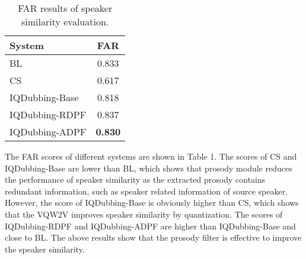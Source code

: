 \documentclass{article}
\begin{document}
\begin{table}[!htbp]
\centering
\caption{FAR results of speaker similarity evaluation.}\vspace{5pt}
\begin{tabular}{l|c}
\toprule
System&FAR\\
\midrule
BL&0.833\\
\hline
CS&0.617\\
\hline
IQDubbing-Base&0.818\\
\hline
IQDubbing-RDPF&0.837\\
\hline
IQDubbing-ADPF&\textbf{0.830}\\
\bottomrule
\end{tabular}
\end{table}

The FAR scores of different systems are shown in Table 1. The scores of CS and IQDubbing-Base are lower than BL, which shows that prosody module reduces the performance of speaker similarity as the extracted prosody contains redundant information, such as speaker related information of source speaker. However, the score of IQDubbing-Base is obviously higher than CS, which shows that the VQW2V improves  speaker similarity by quantization. The scores of IQDubbing-RDPF and IQDubbing-ADPF are  higher than IQDubbing-Base and close to BL. The above results show that the prosody filter is effective to improve the speaker similarity.




\end{document}
